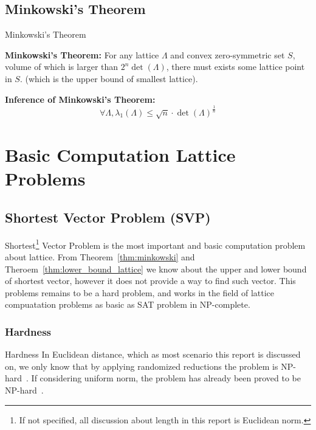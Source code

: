 \documentclass{beamer}
\begin{document}
	\subsection{Minkowski's Theorem}
	\begin{frame}{Minkowski's Theorem}
		\begin{theorem}
			\label{thm:minkowski}
			\textbf{Minkowski's Theorem:} For any lattice $\Lambda$ and convex zero-symmetric set $S$, volume of which is larger than $2^n\det(\Lambda)$, there must exists some lattice point in $S$. (which is the upper bound of smallest lattice).
		\end{theorem}
		\begin{theorem}
			\textbf{Inference of Minkowski's Theorem:}
			\begin{equation}
				\forall \Lambda, \lambda_1(\Lambda)\leq \sqrt{n}\cdot \det(\Lambda)^ {\frac{1}{n} }
			\end{equation}
		\end{theorem}
	\end{frame}
	\section{Basic Computation Lattice Problems}
	\subsection{Shortest Vector Problem (SVP)}
	\begin{frame}
		Shortest\footnote{If not specified, all discussion about length in this report is Euclidean norm.} Vector Problem is the most important and basic computation problem about lattice. From Theorem~\ref{thm:minkowski} and Theroem~\ref{thm:lower_bound_lattice} we know about the upper and lower bound of shortest vector, however it does not provide a way to find such vector. This problems remains to be a hard problem, and works in the field of lattice compuatation problems as basic as SAT problem in NP-complete.
	\end{frame}
	\subsubsection{Hardness}%
	\begin{frame}{Hardness}
			In Euclidean distance, which as most scenario this report is discussed on, we only know that by applying randomized reductions the problem is NP-hard~\cite{SVP_random}. If considering uniform norm, the problem has already been proved to be NP-hard~\cite{SVP_exact}.
	\end{frame}
\end{document}

